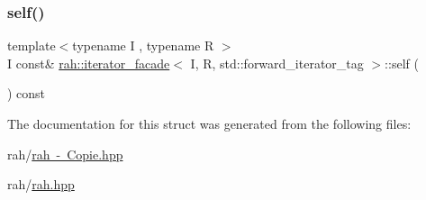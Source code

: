 \mbox{\label{structrah_1_1iterator__facade_3_01_i_00_01_r_00_01std_1_1forward__iterator__tag_01_4_ab4e8c072a2c2058660886dba347b0e78}} 
\subsubsection{\texorpdfstring{self()}{self()}\hspace{0.1cm}{\footnotesize\ttfamily [4/4]}}
{\footnotesize\ttfamily template$<$typename I , typename R $>$ \\
I const\& \mbox{\hyperlink{structrah_1_1iterator__facade}{rah\+::iterator\+\_\+facade}}$<$ I, R, std\+::forward\+\_\+iterator\+\_\+tag $>$\+::self (\begin{DoxyParamCaption}{ }\end{DoxyParamCaption}) const\hspace{0.3cm}{\ttfamily [inline]}}



The documentation for this struct was generated from the following files\+:\begin{DoxyCompactItemize}
\item 
rah/\mbox{\hyperlink{rah_01-_01_copie_8hpp}{rah -\/ Copie.\+hpp}}\item 
rah/\mbox{\hyperlink{rah_8hpp}{rah.\+hpp}}\end{DoxyCompactItemize}
